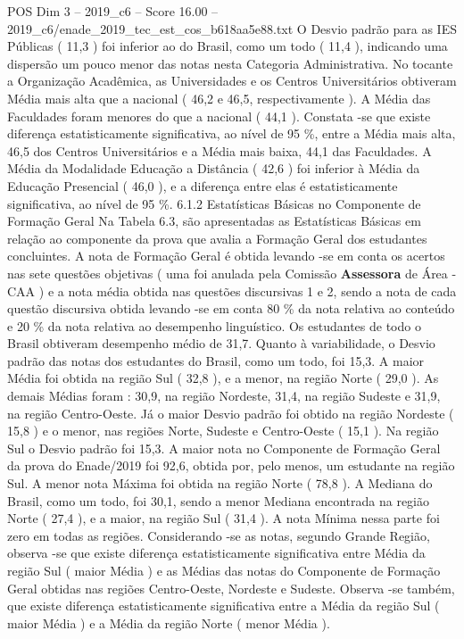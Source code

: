 \begin{textsample}{POS Dim 3 – 2019\_c6 – Score 16.00 – 2019\_c6/enade\_2019\_tec\_est\_cos\_b618aa5e88.txt}
O Desvio padrão para as IES Públicas ( 11,3 ) foi inferior ao do Brasil, como um todo ( 11,4 ), indicando uma dispersão um pouco menor das notas nesta Categoria Administrativa.
No tocante a Organização Acadêmica, as Universidades e os Centros Universitários obtiveram Média mais alta que a nacional ( 46,2 e 46,5, respectivamente ).
A Média das Faculdades foram menores do que a nacional ( 44,1 ).
Constata -se que existe diferença estatisticamente significativa, ao nível de 95 \%, entre a Média mais alta, 46,5 dos Centros Universitários e a Média mais baixa, 44,1 das Faculdades.
A Média da Modalidade Educação a Distância ( 42,6 ) foi inferior à Média da Educação Presencial ( 46,0 ), e a diferença entre elas é estatisticamente significativa, ao nível de 95 \%. 6.1.2 Estatísticas Básicas no Componente de Formação Geral Na Tabela 6.3, são apresentadas as Estatísticas Básicas em relação ao componente da prova que avalia a Formação Geral dos estudantes concluintes.
A nota de Formação Geral é obtida levando -se em conta os acertos nas sete questões objetivas ( uma foi anulada pela Comissão \textbf{Assessora} de Área - CAA ) e a nota média obtida nas questões discursivas 1 e 2, sendo a nota de cada questão discursiva obtida levando -se em conta 80 \% da nota relativa ao conteúdo e 20 \% da nota relativa ao desempenho linguístico.
Os estudantes de todo o Brasil obtiveram desempenho médio de 31,7.
Quanto à variabilidade, o Desvio padrão das notas dos estudantes do Brasil, como um todo, foi 15,3.
A maior Média foi obtida na região Sul ( 32,8 ), e a menor, na região Norte ( 29,0 ).
As demais Médias foram : 30,9, na região Nordeste, 31,4, na região Sudeste e 31,9, na região Centro-Oeste.
Já o maior Desvio padrão foi obtido na região Nordeste ( 15,8 ) e o menor, nas regiões Norte, Sudeste e Centro-Oeste ( 15,1 ).
Na região Sul o Desvio padrão foi 15,3.
A maior nota no Componente de Formação Geral da prova do Enade/2019 foi 92,6, obtida por, pelo menos, um estudante na região Sul.
A menor nota Máxima foi obtida na região Norte ( 78,8 ).
A Mediana do Brasil, como um todo, foi 30,1, sendo a menor Mediana encontrada na região Norte ( 27,4 ), e a maior, na região Sul ( 31,4 ).
A nota Mínima nessa parte foi zero em todas as regiões.
Considerando -se as notas, segundo Grande Região, observa -se que existe diferença estatisticamente significativa entre Média da região Sul ( maior Média ) e as Médias das notas do Componente de Formação Geral obtidas nas regiões Centro-Oeste, Nordeste e Sudeste.
Observa -se também, que existe diferença estatisticamente significativa entre a Média da região Sul ( maior Média ) e a Média da região Norte ( menor Média ).

\end{textsample}
